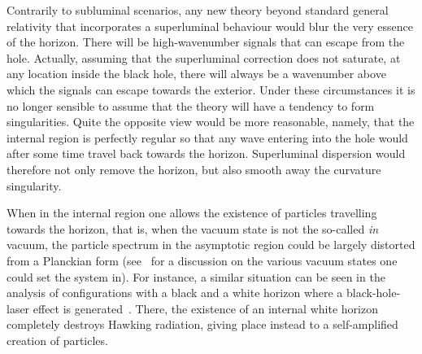 \documentclass[11pt,a4paper]{article}
\begin{document}
Contrarily to subluminal scenarios, any new theory beyond standard 
general relativity that incorporates a superluminal behaviour would 
blur the very essence of the horizon. There will be high-wavenumber 
signals that can escape from the hole. Actually, assuming that the 
superluminal correction does not saturate, at any location inside the 
black hole, there will always be a wavenumber above which the signals 
can escape towards the exterior. Under these circumstances it is no 
longer sensible to assume that the theory will have a tendency to form 
singularities. Quite the opposite view would be more reasonable, 
namely, that the internal region is perfectly regular so that any wave 
entering into the hole would after some time travel back towards the 
horizon. Superluminal dispersion would therefore not only remove the 
horizon, but also smooth away the curvature singularity.

When in the internal region one allows the existence of particles
travelling towards the horizon, that is, when the vacuum state is not
the so-called \emph{in} vacuum,  the particle spectrum  in the
asymptotic region could be largely distorted from a Planckian form 
(see~\cite{barcelo-vacuum-selection} for a discussion on the various vacuum
states one  could set the system in). For instance, a similar
situation can be seen in the analysis of  configurations with a black and a
white horizon  where a black-hole-laser effect is 
generated~\cite{corley-jacobson-lasers,parentani-finazzi,coutant,Leonhardt:2007zz}. There,  the existence of an
internal white horizon completely destroys Hawking radiation, giving place
instead to a self-amplified creation of particles. 
\end{document}
